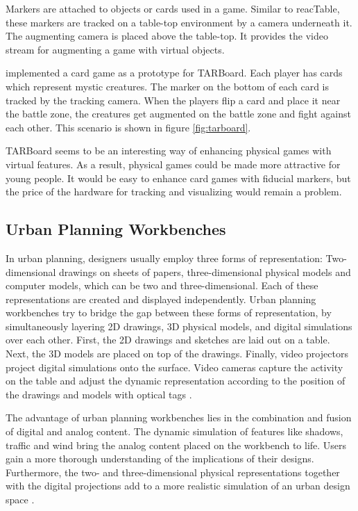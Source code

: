 Markers are attached to objects or cards used in a game. Similar to reacTable, these markers are tracked on a table-top environment by a camera underneath it. The augmenting camera is placed above the table-top. It provides the video stream for augmenting a game with virtual objects.

\cite{lee05} implemented a card game as a prototype for TARBoard. Each player has cards which represent mystic creatures. The marker on the bottom of each card is tracked by the tracking camera. When the players flip a card and place it near the battle zone, the creatures get augmented on the battle zone and fight against each other. This scenario is shown in figure \ref{fig:tarboard}.

TARBoard seems to be an interesting way of enhancing physical games with virtual features. As a result, physical games could be made more attractive for young people. It would be easy to enhance card games with fiducial markers, but the price of the hardware for tracking and visualizing would remain a problem. 

\subsection{Urban Planning Workbenches}
In urban planning, designers usually employ three forms of representation: Two-dimensional drawings on sheets of papers, three-dimensional physical models and computer models, which can be two and three-dimensional. Each of these representations are created and displayed independently. Urban planning workbenches try to bridge the gap between these forms of representation, by simultaneously layering 2D drawings, 3D physical models, and digital simulations over each other. 
First, the 2D drawings and sketches are laid out on a table. Next, the 3D models are placed on top of the drawings. Finally, video projectors project digital simulations onto the surface. Video cameras capture the activity on the table and adjust the dynamic representation according to the position of the drawings and models with optical tags \cite{ishii02}.

The advantage of urban planning workbenches lies in the combination and fusion of digital and analog content. The dynamic simulation of features like shadows, traffic and wind bring the analog content placed on the workbench to life. Users gain a more thorough understanding of the implications of their designs. Furthermore, the two- and three-dimensional physical representations together with the digital projections add to a more realistic simulation of an urban design space \cite{ishii02}.

